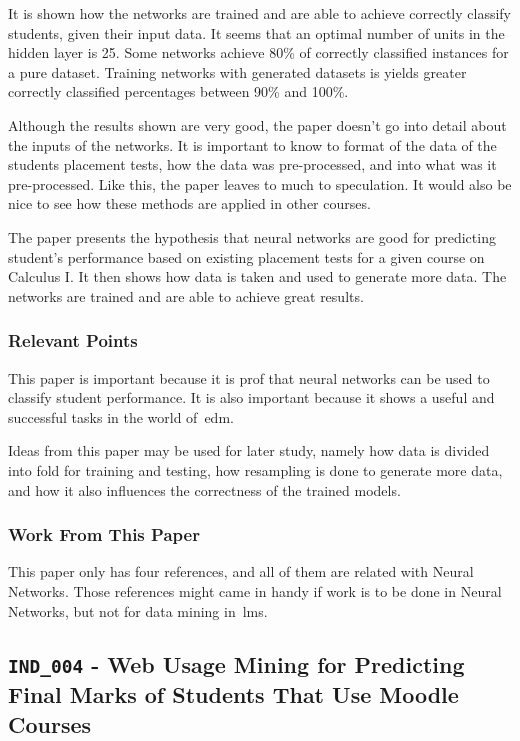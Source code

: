 It is shown how the networks are trained and are able to achieve correctly
classify students, given their input data. It seems that an optimal number of
units in the hidden layer is 25. Some networks achieve 80\% of correctly
classified instances for a pure dataset. Training networks with generated
datasets is yields greater correctly classified percentages between 90\% and
100\%.

Although the results shown are very good, the paper doesn't go into detail
about the inputs of the networks. It is important to know to format of the data
of the students placement tests, how the data was pre-processed, and into what
was it pre-processed. Like this, the paper leaves to much to speculation. It
would also be nice to see how these methods are applied in other courses.

The paper presents the hypothesis that neural networks are good for predicting
student's performance based on existing placement tests for a given course on
Calculus I. It then shows how data is taken and used to generate more data. The
networks are trained and are able to achieve great results.

\subsubsection{Relevant Points}

This paper is important because it is prof that neural networks can be used to
classify student performance. It is also important because it shows a useful
and successful tasks in the world of~\gls{edm}.

Ideas from this paper may be used for later study, namely how data is divided
into fold for training and testing, how resampling is done to generate more
data, and how it also influences the correctness of the trained models.

\subsubsection{Work From This Paper}

This paper only has four references, and all of them are related with Neural
Networks. Those references might came in handy if work is to be done in Neural
Networks, but not for data mining in~\gls{lms}.

\subsection{\texttt{IND\_004} - Web Usage Mining for Predicting Final Marks of
Students That Use Moodle Courses}

